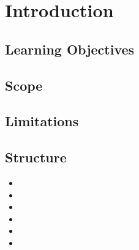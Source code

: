 \chapter{Introduction}
\section{Learning Objectives}

\section{Scope}

\section{Limitations}

\section{Structure}

\begin{itemize}
	\item {}%
	\item {}%
	\item {}%
	\item {}%
	\item {}%
	\item {}%
\end{itemize}